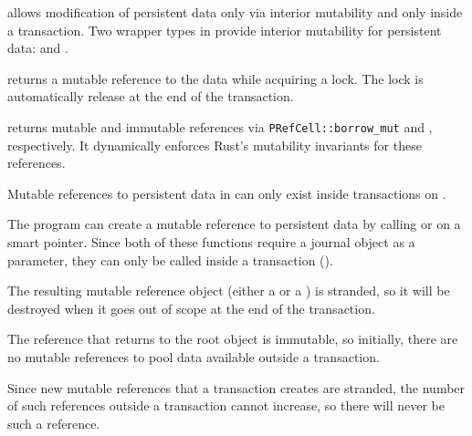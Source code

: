 \This{} allows modification of persistent data only via interior mutability
and only inside a transaction.
Two wrapper types in  provide interior mutability for persistent data:
 and .%

 returns a mutable reference to the data while
acquiring a lock.  The lock is automatically release at the end of the
transaction.

 returns mutable and immutable references via\linebreak
\texttt{PRefCell::borrow\_mut} and ,
respectively.  It dynamically enforces Rust's mutability
invariants for these references.


\begin{invar}
  \label{inv:mutable-in-tx-only}
  Mutable references to persistent data in  can only exist inside transactions on .
\end{invar}

\begin{discuss}
  The program can create a mutable reference to persistent data by calling
   or  on a smart pointer.  Since both of
  these functions require a journal object as a parameter, they can only be called inside a
  transaction ().

  The resulting mutable reference object (either a  or a
  ) is stranded, so it will be destroyed when it goes out of
  scope at the end of the transaction.
  
  The reference that  returns to the root object is immutable, so
  initially, there are no mutable references to pool data available outside a
  transaction.

  Since new mutable references that a transaction creates are stranded, the
  number of such references outside a transaction cannot increase, so there
  will never be such a reference.
\end{discuss}

